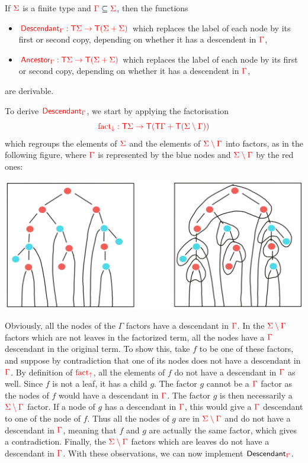 \medskip
\noindent\begin{example} If ${\color{red}{\Sigma}}$ is a finite type and ${\color{red}{\Gamma}}\subseteq {\color{red}{\Sigma}}$, then the functions 
\begin{itemize}
\item ${\color{red}{\mathsf{Descendant}_{\color{red}{\Gamma}}: {\color{red}{\mathsf T}}{\color{red}{\Sigma}}\to {\color{red}{\mathsf T}}({\color{red}{\Sigma}}+{\color{red}{\Sigma}})}}$ which replaces the label of each node by its first or second copy, depending on whether it has a descendent in ${\color{red}{\Gamma}}$,
\item ${\color{red}{\mathsf{Ancestor}_{\color{red}{\Gamma}}: {\color{red}{\mathsf T}}{\color{red}{\Sigma}}\to {\color{red}{\mathsf T}}({\color{red}{\Sigma}}+{\color{red}{\Sigma}})}}$ which replaces the label of each node by its first or second copy, depending on whether it has a descendent in ${\color{red}{\Gamma}}$,
\end{itemize}
are derivable.

To derive ${\color{red}{\mathsf{Descendant}_{\color{red}{\Gamma}}}}$, we start by applying the factorisation $${\color{red}{{\color{red}{\mathrm{fact_{\downarrow}}}}: {\color{red}{\mathsf T}}{\color{red}{\Sigma}}\to {\color{red}{\mathsf T}}({\color{red}{\mathsf T}}{\color{red}{\Gamma}}+{\color{red}{\mathsf T}}({\color{red}{\Sigma}}\setminus{\color{red}{\Gamma}}))}}$$ which regroups the elements of ${\color{red}{\Sigma}}$ and the elements of ${\color{red}{{\color{red}{\Sigma}}\setminus{\color{red}{\Gamma}}}}$ into factors, as in the following figure, where ${\color{red}{\Gamma}}$ is represented by the blue nodes and ${\color{red}{{\color{red}{\Sigma}}\setminus {\color{red}{\Gamma}}}}$ by the red ones:
\begin{center}
\includegraphics[scale=.15]{MyPic6.jpg}
\end{center}
Obviously, all the nodes of the $\Gamma$ factors have a descendant in ${\color{red}{\Gamma}}$. 
In the ${\color{red}{{\color{red}{\Sigma}}\setminus{\color{red}{\Gamma}}}}$ factors which are not leaves in the factorized term, all the nodes have a ${\color{red}{\Gamma}}$ descendant in the original term. To show this, take $f$ to be one of these factors, and suppose by contradiction that one of its nodes does not have a descendant in ${\color{red}{\Gamma}}$. By definition of ${\color{red}{\mathrm{fact_{\uparrow}}}}$, all the elements of $f$ do not have a descendant in ${\color{red}{\Gamma}}$ as well. Since $f$ is not a leaf, it has a child $g$. The factor $g$ cannot be a ${\color{red}{\Gamma}}$
factor as the nodes of $f$ would have a descendant in ${\color{red}{\Gamma}}$. The factor $g$ is then necessarily  a ${\color{red}{{\color{red}{\Sigma}}\setminus {\color{red}{\Gamma}}}}$ factor. If a node of $g$ has a descendant in ${\color{red}{\Gamma}}$, this would give a ${\color{red}{\Gamma}}$ descendant to one of the node of $f$. Thus all the nodes of $g$ are in ${\color{red}{{\color{red}{\Sigma}}\setminus {\color{red}{\Gamma}}}}$ and do not have a descendant in ${\color{red}{\Gamma}}$, meaning that $f$ and $g$ are actually the same factor, which gives a contradiction. Finally, the ${\color{red}{{\color{red}{\Sigma}}\setminus{\color{red}{\Gamma}}}}$ factors which are leaves do not have a descendant in ${\color{red}{\Gamma}}$. With these observations, we can now implement $\mathsf{Descendant}_{\color{red}{\Gamma}}$. 


\end{example}
